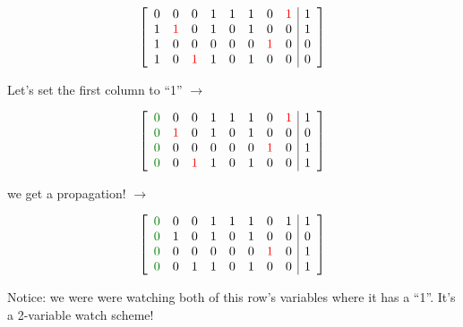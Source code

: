\documentclass[aspectratio=196]{slides}
\begin{document}
\begin{minipage}{0.3\linewidth}
\[
\left[
\begin{array}{llllllll|l}
0 &            0 &           0 & 1 & 1 & 1 &            0 & \color{red}1 & 1\\
1 & \color{red}1 &           0 & 1 & 0 & 1 &            0 &            0 & 1\\
1 &            0 &           0 & 0 & 0 & 0 & \color{red}1 &            0 & 0\\
1 &            0 &\color{red}1 & 1 & 0 & 1 &            0 &            0 & 0\\
\end{array}
\right]
\]
\end{minipage}
%
\begin{minipage}{0.3\linewidth}
\centering
Let's set the first column to ``1'' $\rightarrow$
\end{minipage}
%
\begin{minipage}{0.3\linewidth}
\[
\left[
\begin{array}{llllllll|l}
\color{darkgreen}0 &            0 &           0 & 1 & 1 & 1 &            0 & \color{red}1 & 1\\
\color{darkgreen}0 & \color{red}1 &           0 & 1 & 0 & 1 &            0 &            0 & 0\\
\color{darkgreen}0 &            0 &           0 & 0 & 0 & 0 & \color{red}1 &            0 & 1\\
\color{darkgreen}0 &            0 &\color{red}1 & 1 & 0 & 1 &            0 &            0 & 1\\
\end{array}
\right]
\]
\end{minipage}

\begin{minipage}{0.3\linewidth}
\centering
we get a propagation!
$\rightarrow$
\end{minipage}
\begin{minipage}{0.3\linewidth}
\[
\left[
\begin{array}{llllllll|l}
\color{darkgreen}0 &            0 &           0 & 1 & 1 & 1 &            0 & 1 & 1\\
\color{darkgreen}0 & 1 &           0 & 1 & 0 & 1 &            0 &            0 & 0\\
\color{darkgreen}0 &            0 &           0 & 0 & 0 & 0 & \color{red}1 &            0 & 1\\
\color{darkgreen}0 &            0 &1 & 1 & 0 & 1 &            0 &            0 & 1\\
\end{array}
\right]
\]
\end{minipage}
\begin{minipage}{0.3\linewidth}
Notice: we were were watching both of this row's variables where it has a ``1''. It's a 2-variable watch scheme!
\end{minipage}
\end{document}
